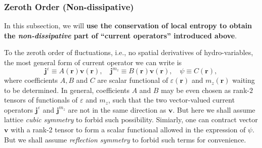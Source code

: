 \documentclass[10pt,nofootinbib,letterpaper]{revtex4}
\begin{document}
		\subsubsection{Zeroth Order (Non-dissipative)}
			In this subsection, we will \textbf{use the conservation of local entropy to obtain the \emph{non-dissipative} part of ``current operators'' introduced above}. \par
			To the zeroth order of fluctuations, i.e., no spatial derivatives of hydro-variables, the most general form of current operator we can write is
			\begin{equation}\label{2.1.1}
				\bm{j}^\varepsilon\equiv A(\bm{r})\bm{v}(\bm{r}),\quad \bm{j}^{m_z}\equiv B(\bm{r})\bm{v}(\bm{r}),\quad \psi\equiv C(\bm{r}),
			\end{equation}
			where coefficients $A,B$ and $C$ are scalar functional of $\varepsilon(\bm{r})$ and $m_z(\bm{r})$ waiting to be determined. In general, coefficients $A$ and $B$ may be even chosen as rank-$2$ tensors of functionals of $\varepsilon$ and $m_z$, such that the two vector-valued current operators $\bm{j}^\varepsilon$ and $\bm{j}^{m_z}$ are not in the same direction as $\bm{v}$. {\color{red}But here we shall assume lattice \emph{cubic symmetry} \cite{halperin1969hydrodynamic} to forbid such possibility}. Simiarly, one can contract vector $\bm{v}$ with a rank-2 tensor to form a scalar functional allowed in the expression of $\psi$. {\color{red}But we shall assume \emph{reflection symmetry} to forbid such terms for convenience}.\par
\end{document}
